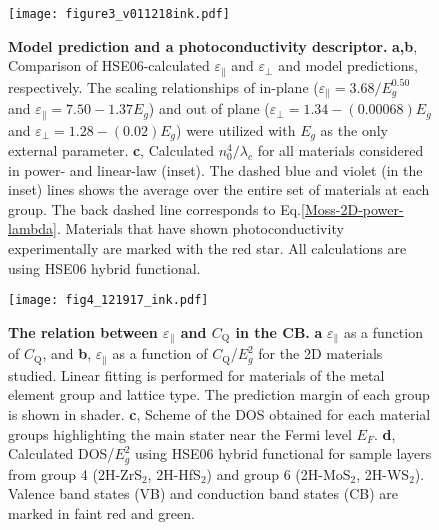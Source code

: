 \documentclass[journal=ancac3,manuscript=article,email=true,hyperref=true,keywords=true]{achemso}
\begin{document}
\begin{figure}[htbp]
\centering
\texttt{[image: figure3\_v011218ink.pdf]}
\caption{\label{fig-3} {\bf Model prediction and a photoconductivity descriptor.}
{\bf a,b}, Comparison of HSE06-calculated \(\varepsilon_{\parallel}\) and \(\varepsilon_{\perp}\) 
and model predictions, respectively. The scaling relationships of in-plane ($\varepsilon_{\parallel}=3.68/E_{g}^{0.50}$ and $\varepsilon_{\parallel}=7.50-1.37E_{g}$) and out of plane ($\varepsilon_{\perp}=1.34-(0.00068)E_{g}$ and $\varepsilon_{\perp}=1.28-(0.02)E_{g}$) were utilized with $E_{g}$ as the only external parameter.  
{\bf c}, Calculated $n_{0}^{4}/\lambda_{c}$ for all materials considered in power- and linear-law (inset). The dashed blue and violet (in the inset) lines shows the average over the entire set of materials at each group. 
The back dashed line corresponds to Eq.\ref{Moss-2D-power-lambda}. 
Materials that have shown photoconductivity experimentally are marked with the red star\cite{Andres15,photo-2Dmaterials}. 
All calculations are using HSE06 hybrid functional. 
}
\end{figure}




\begin{figure}[htbp]
\centering
\texttt{[image: fig4\_121917\_ink.pdf]}
\caption{\label{fig-5}
{\bf The relation between \(\varepsilon_{\parallel}\) and \(C_{\mathrm{Q}}\) in the CB.} {\bf a} \(\varepsilon_{\parallel}\) as a function of \(C_{\mathrm{Q}}\), and {\bf b}, \(\varepsilon_{\parallel}\) as a function of \(C_{\mathrm{Q}}\)/$E_{g}^{2}$ for the 2D materials studied. Linear fitting is performed for materials of the metal element group and lattice type. The prediction margin of each group is shown in shader. {\bf c}, Scheme of the DOS obtained for each material groups highlighting the main stater near the Fermi level $E_F$. {\bf d}, Calculated DOS/$E_{g}^{2}$ using HSE06 hybrid functional for sample layers from group 4 (2H-ZrS$_2$, 2H-HfS$_2$) and group 6 (2H-MoS$_2$, 2H-WS$_2$). Valence band states (VB) and conduction band states (CB) are marked in faint red and green.
}
\end{figure}







\end{document}
